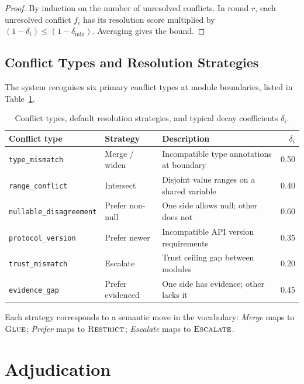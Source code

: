 \documentclass[11pt]{article}
\begin{document}
\begin{proof}
By induction on the number of unresolved conflicts.  In round $r$,
each unresolved conflict $f_i$ has its resolution score multiplied by
$(1 - \delta_i) \leq (1 - \delta_{\min})$.  Averaging gives the bound.
\end{proof}

\subsection{Conflict Types and Resolution Strategies}

The \JuGeo{} system recognises six primary conflict types at module
boundaries, listed in Table~\ref{tab:conflicts}.

\begin{table}[H]
\centering
\caption{Conflict types, default resolution strategies, and typical
decay coefficients $\delta_i$.}\label{tab:conflicts}
\small
\begin{tabularx}{\linewidth}{l l X r}
\toprule
\textbf{Conflict type} & \textbf{Strategy} & \textbf{Description} & $\delta_i$ \\
\midrule
\texttt{type\_mismatch}       & Merge / widen       & Incompatible type annotations at boundary & 0.50 \\
\texttt{range\_conflict}      & Intersect           & Disjoint value ranges on a shared variable & 0.40 \\
\texttt{nullable\_disagreement} & Prefer non-null   & One side allows null; other does not        & 0.60 \\
\texttt{protocol\_version}    & Prefer newer        & Incompatible API version requirements       & 0.35 \\
\texttt{trust\_mismatch}      & Escalate            & Trust ceiling gap between modules           & 0.20 \\
\texttt{evidence\_gap}        & Prefer evidenced    & One side has evidence; other lacks it       & 0.45 \\
\bottomrule
\end{tabularx}
\end{table}

Each strategy corresponds to a semantic move in the \JuGeo{} vocabulary:
\emph{Merge} maps to $\textsc{Glue}$; \emph{Prefer} maps to $\textsc{Restrict}$;
\emph{Escalate} maps to $\textsc{Escalate}$.

\section{Adjudication}\label{sec:adjudication}
\end{document}
